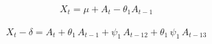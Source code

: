 \documentclass[12pt]{article}
\begin{document}
\pagestyle{empty}
\Large
{}
\pagecolor{ehandbook}

\boldmath
\begin{eqnarray*}
X_t = \mu + A_t - \theta_1 A_{t-1} 
\end{eqnarray*}

\begin{eqnarray*}
X_t - \delta = A_t + \theta_1 \, A_{t-1}
                              + \psi_1 \, A_{t-12}
                              + \theta_1 \, \psi_1 \, A_{t-13}
\end{eqnarray*}
\end{document}
